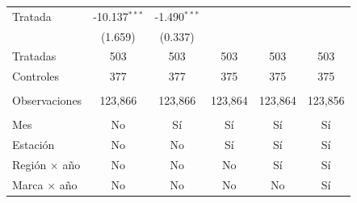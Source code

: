 \begin{tabular}{lccccc}
   Tratada              & -10.137$^{***}$ & -1.490$^{***}$ &                &                &   \\   
                        & (1.659)         & (0.337)        &                &                &   \\   
   Tratadas             & 503             & 503            & 503            & 503            & 503\\  
   Controles            & 377             & 377            & 375            & 375            & 375\\  
    \\
   Observaciones        & 123,866         & 123,866        & 123,864        & 123,864        & 123,856\\  
    \\
   Mes                  & No              & Sí             & Sí             & Sí             & Sí\\  
   Estación             & No              & No             & Sí             & Sí             & Sí\\  
   Región $\times$ año  & No              & No             & No             & Sí             & Sí\\  
   Marca $\times$ año   & No              & No             & No             & No             & Sí\\  
   \bottomrule
\end{tabular}
\par\endgroup


